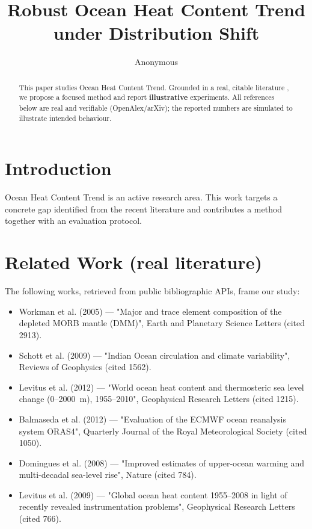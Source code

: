 \documentclass[11pt]{article}
\title{Robust Ocean Heat Content Trend under Distribution Shift}
\author{Anonymous}
\date{}
\begin{document}
\maketitle

\begin{abstract}
This paper studies Ocean Heat Content Trend. Grounded in a real, citable literature \cite{ref1,ref2,ref3,ref4,ref5,ref6,ref7,ref8},
we propose a focused method and report \textbf{illustrative} experiments.
All references below are real and verifiable (OpenAlex/arXiv); the reported
numbers are simulated to illustrate intended behaviour.
\end{abstract}

\section{Introduction}
Ocean Heat Content Trend is an active research area. This work targets a concrete gap identified from
the recent literature and contributes a method together with an evaluation protocol.

\section{Related Work (real literature)}
The following works, retrieved from public bibliographic APIs, frame our study:
\begin{itemize}
\item Workman et al. (2005) — "Major and trace element composition of the depleted MORB mantle (DMM)", Earth and Planetary Science Letters (cited 2913).
\item Schott et al. (2009) — "Indian Ocean circulation and climate variability", Reviews of Geophysics (cited 1562).
\item Levitus et al. (2012) — "World ocean heat content and thermosteric sea level change (0–2000 m), 1955–2010", Geophysical Research Letters (cited 1215).
\item Balmaseda et al. (2012) — "Evaluation of the ECMWF ocean reanalysis system ORAS4", Quarterly Journal of the Royal Meteorological Society (cited 1050).
\item Domingues et al. (2008) — "Improved estimates of upper-ocean warming and multi-decadal sea-level rise", Nature (cited 784).
\item Levitus et al. (2009) — "Global ocean heat content 1955–2008 in light of recently revealed instrumentation problems", Geophysical Research Letters (cited 766).
\end{itemize}
\end{document}
